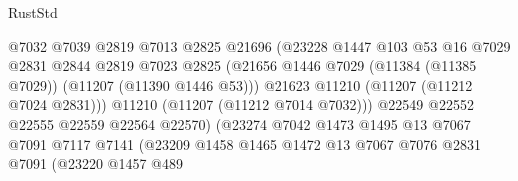 \begin{lexlean}{RustStd}
\begin{coremodule}
                                        @7032
                                        @7039
                                        @2819
                                        @7013
                                        @2825
                                        @21696
                                        (@23228
                                          @1447
                                          @103
                                          @53
                                          @16
                                          @7029
                                          @2831
                                          @2844
                                          @2819
                                          @7023
                                          @2825
                                          (@21656
                                            @1446
                                            @7029
                                            (@11384 (@11385 @7029))
                                            (@11207 (@11390 @1446 @53)))
                                          @21623
                                          @11210
                                          (@11207 (@11212 @7024 @2831)))
                                        @11210
                                        (@11207 (@11212 @7014 @7032)))
                                      @22549
                                      @22552
                                      @22555
                                      @22559
                                      @22564
                                      @22570)
                                    (@23274
                                      @7042
                                      @1473
                                      @1495
                                      @13
                                      @7067
                                      @7091
                                      @7117
                                      @7141
                                      (@23209
                                        @1458
                                        @1465
                                        @1472
                                        @13
                                        @7067
                                        @7076
                                        @2831
                                        @7091
                                        (@23220
                                          @1457
                                          @489

\end{coremodule}
\end{lexlean}
